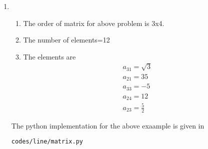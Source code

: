 \renewcommand{\theequation}{\theenumi}
\begin{enumerate}[label=\arabic*.,ref=\thesubsubsection.\theenumi]
\item
\begin{enumerate}
\item The order of matrix for above problem is 3x4.
\item The number of elements=12
\item The elements are
\begin{align}
a_{31}=\sqrt{3}
\\
a_{21}=35
\\
a_{33}=-5
\\
a_{24}=12
\\
a_{23}=\frac{5}{2}
\end{align}
\end{enumerate}
The python implementation for the above exaample is given in 
\begin{lstlisting}
codes/line/matrix.py
\end{lstlisting}
\end{enumerate}
